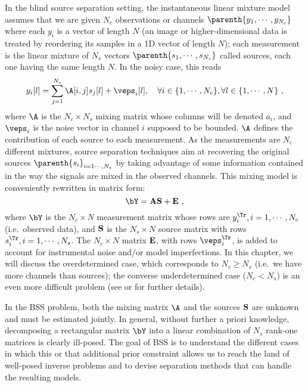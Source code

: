 In the blind source separation setting, the instantaneous linear mixture model assumes that we are given $N_c$ observations or channels 
$\parenth{y_1,\cdots, y_{N_c}}$ where each $y_i$ is a vector of length $N$ (an image or higher-dimensional data is treated by reordering its samples in a 1D vector of length $N$); each measurement is the linear mixture of $N_s$ vectors $\parenth{s_1,\cdots, s_{N_s}}$ called sources, each one having the same length $N$. In the noisy case, this reads
\begin{equation}
\label{eq:bss_model}
y_i[l] = \sum_{j=1}^{N_s} \A[i,j] s_j[l] + \veps_i[l], \quad \forall i\in\{1,\cdots,N_c\},\forall l\in\{1,\cdots, N\} ~,
\end{equation}
where $\A$ is the $N_c \times N_s$ mixing matrix whose columns will be denoted $a_i$, and $\veps_i$ is the noise vector in channel $i$ supposed to be bounded. ${\A}$ defines the contribution of each source to each measurement. As the measurements are $N_c$ different mixtures, source separation techniques aim at recovering the original sources $\parenth{s_i}_{i=1\cdots,N_s}$ by taking advantage of some information contained in the way the signals are mixed in the observed channels. This mixing model is conveniently rewritten in matrix form:
\begin{equation}
\label{eq:mix_model}
{\bY} = {\bf{AS}} + {\bf E} ~,
\end{equation}
where ${\bY}$ is the $N_c \times N$ measurement matrix whose rows are $y_i^\Tr, i=1,\cdots,N_c$ (i.e.\ observed data), and $\bf S$ is the $N_s \times N$ source matrix with rows $s_i^\Tr, i=1,\cdots,N_s$. The $N_c \times N$ matrix $\bf E$, with rows $\veps_i^\Tr$, is added to account for instrumental noise and/or model imperfections. In this chapter, we will discuss the overdetermined case, which corresponds to $N_c \ge N_s$ (i.e.\ we have more channels than sources); the converse underdetermined case ($N_c  < N_s$) is an even more difficult problem (see \citet{JRY00} or \citet{ica:cichocki} for further details).

In the BSS problem, both the mixing matrix $\A$ and the sources $\bf S$ are unknown and must be estimated jointly. In general, without further a priori knowledge, decomposing a rectangular matrix $\bY$ into a linear combination of $N_s$ rank-one matrices is clearly ill-posed. The goal of BSS is to understand the different cases in which this or that additional prior constraint allows us to reach the land of well-posed inverse problems and to devise separation methods that can handle the resulting models. 


